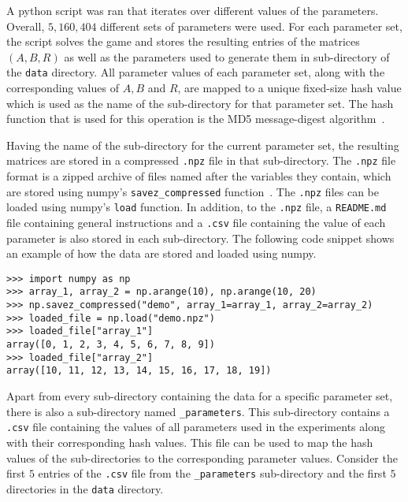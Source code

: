 A python script was ran that iterates over different values of the parameters.
Overall, \(5,160,404\) different sets of parameters were used.
For each parameter set, the script solves the game and stores the resulting
entries of the matrices \((A, B, R)\) as well as the parameters used to generate
them in sub-directory of the \lstinline{data} directory.
All parameter values of each parameter set, along with the corresponding values
of \(A, B\) and \(R\), are mapped to a unique fixed-size hash value which is
used as the name of the sub-directory for that parameter set.
The hash function that is used for this operation is the MD5 message-digest
algorithm~\cite{rivest1992md5}.

Having the name of the sub-directory for the current parameter set, the
resulting matrices are stored in a compressed \lstinline{.npz} file in that
sub-directory.
The \lstinline{.npz} file format is a zipped archive of files
named after the variables they contain, which are stored using numpy's
\lstinline[style=pystyle]{savez_compressed} function~\cite{2020NumPy-Array}.
The \lstinline{.npz} files can be loaded using numpy's
\lstinline[style=pystyle]{load} function.
In addition, to the \lstinline{.npz} file, a
\lstinline{README.md} file containing general instructions and a
\lstinline{.csv} file containing the value of each parameter is
also stored in each sub-directory.
The following code snippet shows an example of how the data are stored and
loaded using numpy.

\begin{lstlisting}[style=pystyle]
>>> import numpy as np
>>> array_1, array_2 = np.arange(10), np.arange(10, 20)
>>> np.savez_compressed("demo", array_1=array_1, array_2=array_2)
>>> loaded_file = np.load("demo.npz")
>>> loaded_file["array_1"]
array([0, 1, 2, 3, 4, 5, 6, 7, 8, 9])
>>> loaded_file["array_2"]
array([10, 11, 12, 13, 14, 15, 16, 17, 18, 19])

\end{lstlisting}

Apart from every sub-directory containing the data for a specific parameter set,
there is also a sub-directory named \lstinline{_parameters}.
This sub-directory contains a \lstinline{.csv} file containing the
values of all parameters used in the experiments along with their corresponding
hash values.
This file can be used to map the hash values of the sub-directories to the
corresponding parameter values.
Consider the first \(5\) entries of the \lstinline{.csv} file
from the \lstinline{_parameters} sub-directory and the first
\(5\) directories in the \lstinline{data} directory.

